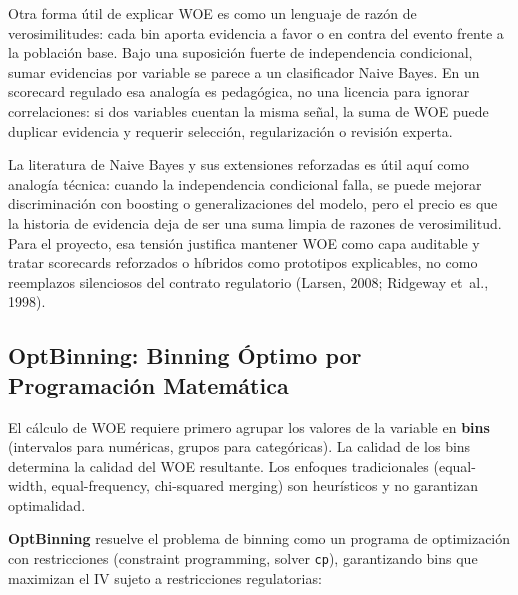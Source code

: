 \documentclass[
  spanish,
  11pt,
  letterpaper,
]{scrbook}
\theoremstyle{plain}
\theoremstyle{remark}
\begin{document}
\begin{tcolorbox}[enhanced jigsaw, arc=.35mm, bottomrule=.15mm, bottomtitle=1mm, breakable, colback=white, colbacktitle=quarto-callout-tip-color!10!white, colframe=quarto-callout-tip-color-frame, coltitle=black, left=2mm, leftrule=.75mm, opacityback=0, opacitybacktitle=0.6, rightrule=.15mm, title=\textcolor{quarto-callout-tip-color}{\faLightbulb}\hspace{0.5em}{WOE y Naive Bayes}, titlerule=0mm, toprule=.15mm, toptitle=1mm]

Otra forma útil de explicar WOE es como un lenguaje de razón de
verosimilitudes: cada bin aporta evidencia a favor o en contra del
evento frente a la población base. Bajo una suposición fuerte de
independencia condicional, sumar evidencias por variable se parece a un
clasificador Naive Bayes. En un scorecard regulado esa analogía es
pedagógica, no una licencia para ignorar correlaciones: si dos variables
cuentan la misma señal, la suma de WOE puede duplicar evidencia y
requerir selección, regularización o revisión experta.

La literatura de Naive Bayes y sus extensiones reforzadas es útil aquí
como analogía técnica: cuando la independencia condicional falla, se
puede mejorar discriminación con boosting o generalizaciones del modelo,
pero el precio es que la historia de evidencia deja de ser una suma
limpia de razones de verosimilitud. Para el proyecto, esa tensión
justifica mantener WOE como capa auditable y tratar scorecards
reforzados o híbridos como prototipos explicables, no como reemplazos
silenciosos del contrato regulatorio (Larsen, 2008; Ridgeway et~al.,
1998).

\end{tcolorbox}

\subsection{OptBinning: Binning Óptimo por Programación
Matemática}\label{optbinning-binning-uxf3ptimo-por-programaciuxf3n-matemuxe1tica}

El cálculo de WOE requiere primero agrupar los valores de la variable en
\textbf{bins} (intervalos para numéricas, grupos para categóricas). La
calidad de los bins determina la calidad del WOE resultante. Los
enfoques tradicionales (equal-width, equal-frequency, chi-squared
merging) son heurísticos y no garantizan optimalidad.

\textbf{OptBinning} resuelve el problema de binning como un programa de
optimización con restricciones (constraint programming, solver
\texttt{cp}), garantizando bins que maximizan el IV sujeto a
restricciones regulatorias:
\end{document}
